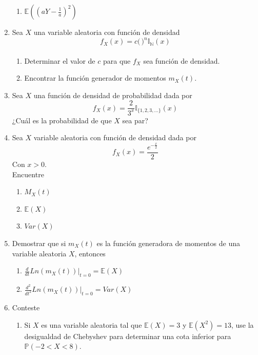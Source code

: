 \documentclass[12pt,a4paper]{report}
\begin{document}
\begin{enumerate}
{\begin{enumerate}
				\item {
					$\mathbb{E}((aY-\frac{1}{a})^2)$
				}
			\end{enumerate}
		}

		\item{
			Sea $X$ una variable aleatoria con función de densidad
			\[f_X(x) = c \Big(\frac{}{}\Big)^n \mathbb{I}_{\mathbb{N}}(x)\]
			\begin{enumerate}
				\item {
					Determinar el valor de $c$ para que $f_X$ sea función de
					densidad.
				}

				\item {
					Encontrar la función generador de momentos $m_X(t)$.
				}
			\end{enumerate}
		}

		\item{
			Sea $X$ una función de densidad de probabilidad dada por
			\[f_X(x) = \frac{2}{3^x} \mathbb{I}_{\{1, 2, 3, ...\}}(x)\]
			¿Cuál es la probabilidad de que $X$ sea par?
		}

		\item{
			Sea $X$ variable aleatoria con función de densidad dada por
			\[f_X(x) = \frac{e^{-\frac{x}{2}}}{2}\]
			Con $x > 0$.\\
			Encuentre
			\begin{enumerate}
				\item {
					$M_X(t)$
				}

				\item {
					$\mathbb{E}(X)$
				}

				\item {
					$Var(X)$
				}
			\end{enumerate}
		}

		\item{
			Demostrar que si $m_X(t)$ es la función generadora de momentos de
			una variable aleatoria $X$, entonces
			\begin{enumerate}
				\item {
				$\frac{d}{dt}Ln(m_X(t))|_{t = 0} = \mathbb{E}(X)$
				}

				\item {
				$\frac{d^2}{dt^2}Ln(m_X(t))|_{t = 0} = Var(X)$
				}
			\end{enumerate}
		}

		\item{
			Conteste
			\begin{enumerate}
				\item {
					Si $X$ es una variable aleatoria tal que
					$\mathbb{E}(X) = 3$ y $\mathbb{E}(X^2) = 13$, use la
					desigualdad de Chebyshev para determinar una cota inferior
					para $\mathbb{P}(-2 < X < 8)$.
				}


\end{enumerate}}
\end{enumerate}
\end{document}

